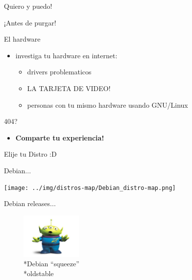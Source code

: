 \documentclass[xcolor=dvipsnames, pdf]{beamer}
\begin{document}
\begin{section}
  {Quiero y puedo!}
  
  \begin{subsection}
    {¡Antes de purgar!}
    \begin{frame}
      {El hardware}
      
      \begin{itemize}
      \item investiga tu hardware en internet:
        
        \begin{itemize}
        \item drivers problematicos
        \item LA TARJETA DE VIDEO!
        \item personas con tu mismo hardware usando GNU/Linux
        \end{itemize}
      \end{itemize}
      404?          
      \begin{itemize}
      \item \textbf{Comparte tu experiencia!}
      \end{itemize}

    \end{frame}
    
    \begin{frame}        
      \begin{center}Elije tu Distro :D\end{center}
    \end{frame}
    
    \begin{frame}
      {Debian...}            
      \begin{center} 
        \texttt{[image: ../img/distros-map/Debian\_distro-map.png]}
      \end{center}
    \end{frame}
    

    \begin{frame}
      {Debian releases...}
      
      \begin{figure}
        \includegraphics[width=3cm]{../img/debrelease/squeeze.jpg}
        \\*Debian ``squeeze'' \\*oldstable
      \end{figure}


\end{frame}
\end{subsection}
\end{section}
\end{document}
